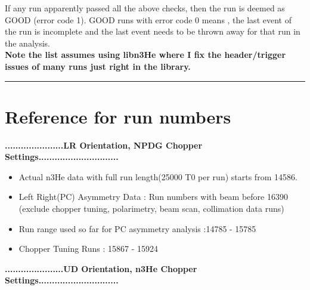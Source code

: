 \documentclass[12pt]{article}
\begin{document}
If any run apparently passed all the above checks, then the run is deemed as GOOD (error code 1). GOOD runs with error code 0 means , the last event of the run is incomplete and the last event needs to be thrown away for that run in the analysis.\\
\textbf{Note the list assumes using libn3He where I fix the header/trigger issues of many runs just right in the library.}

\noindent
{\color{red} \rule{\linewidth}{1mm} }


\newpage
\section{Reference for run numbers}
\textbf{......................LR Orientation, NPDG Chopper Settings..............................}
\begin{itemize}
\item Actual n3He data with full run length(25000 T0 per run) starts from 14586. 

\item Left Right(PC) Asymmetry Data : Run numbers with beam before 16390 (exclude chopper tuning, polarimetry, beam scan, collimation data runs)

\item Run range used so far for PC asymmetry analysis :14785 - 15785  

\item Chopper Tuning Runs : 15867 - 15924 
\end{itemize}
\textbf{......................UD Orientation, n3He Chopper Settings..............................}
\end{document}
